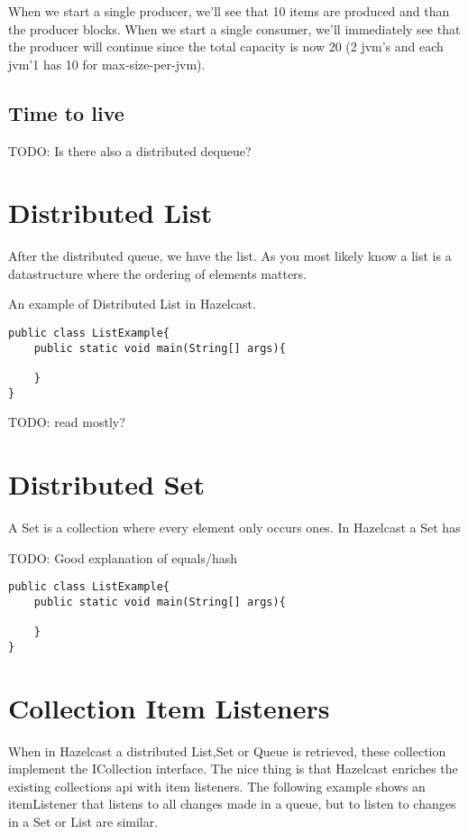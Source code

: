 When we start a single producer, we'll see that 10 items are produced and than the producer
blocks. When we start a single consumer, we'll immediately see that the producer will continue
since the total capacity is now 20 (2 jvm's and each jvm'1 has 10 for max-size-per-jvm). 

\subsection{Time to live}
TODO: Is there also a distributed dequeue?

\section{Distributed List}

After the distributed queue, we have the list. As you most likely know a list is a 
datastructure where the ordering of elements matters. 

An example of Distributed List in Hazelcast.

\begin{verbatim}
public class ListExample{
    public static void main(String[] args){
	
    }
}
\end{verbatim}

TODO: read mostly?

\section{Distributed Set}

A Set is a collection where every element only occurs ones. In Hazelcast a Set has 

TODO: Good explanation of equals/hash

\begin{verbatim}
public class ListExample{
    public static void main(String[] args){
	
    }
}
\end{verbatim}


\section{Collection Item Listeners}

When in Hazelcast a distributed List,Set or Queue is retrieved, these collection implement
the ICollection interface. The nice thing is that Hazelcast enriches the existing collections api
with item listeners. The following example shows an itemListener that listens to all changes made
in a queue, but to listen to changes in a Set or List are similar.

